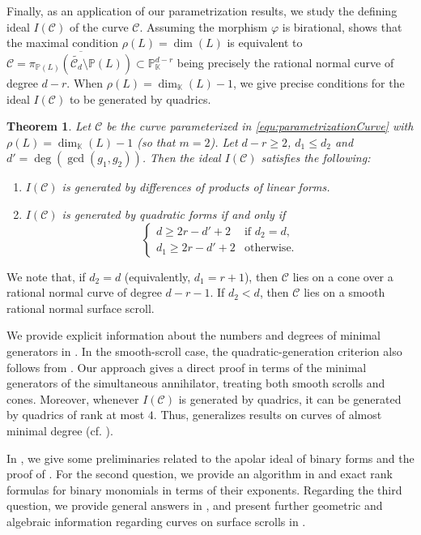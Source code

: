 \documentclass[a4paper, 11pt]{amsart}
\newtheorem{theorem}{Theorem}
\numberwithin{theorem}{section}
\theoremstyle{definition}
\numberwithin{equation}{section}
\begin{document}
Finally, as an application of our parametrization results, we study the defining ideal $I(\mathcal{C})$ of the curve $\mathcal{C}$. 
Assuming the morphism $\varphi$ is birational,  shows that the maximal condition $\rho(L) = \dim(L)$ is equivalent to $\mathcal{C} = \overline{\pi_{\mathbb{P}(L)}(\widetilde{\mathcal{C}_d}\setminus \mathbb{P}(L))} \subset \mathbb{P}_{\mathbb{K}}^{d-r}$ being precisely the rational normal curve of degree $d-r$. 
When $\rho(L) = \dim_{\mathbb{K}}(L)-1$, we give precise conditions for the ideal $I(\mathcal{C})$ to be generated by quadrics.

\begin{theorem}\label{thm:definingequs}
Let $\mathcal{C}$ be the curve parameterized in \eqref{equ:parametrizationCurve} with $\rho(L) = \dim_{\mathbb{K}} (L) - 1$ (so that $m = 2$).
Let $d-r\geq 2$, $d_1\leq d_2$ and $d'=\deg(\gcd(g_1,g_2))$. Then the ideal $I(\mathcal{C})$ satisfies the following:
\begin{enumerate}
    \item\label{thm:definingequs_forms} $I(\mathcal{C})$ is generated by differences of products of linear forms.
    \item\label{thm:definingequs_quad} $I(\mathcal{C})$ is generated by quadratic forms if and only if 
    \[
    \begin{cases}
    d \ge 2r-d'+2 & \text{if } d_2 = d, \\
    d_1 \ge 2r-d'+2 & \text{otherwise}.
    \end{cases}
    \]
\end{enumerate}
\end{theorem}
We note that, if $d_2=d$ (equivalently, $d_1=r+1$), then $\mathcal{C}$ lies on a cone
over a rational normal curve of degree $d-r-1$.
If $d_2<d$, then $\mathcal{C}$ lies on a smooth rational normal surface scroll.

We provide explicit information about the numbers and degrees of minimal generators in .
In the smooth-scroll case, the quadratic-generation criterion also follows from \cite[Theorem~4.4(2)]{MR3247023}.
Our approach gives a direct proof in terms of the minimal generators of the simultaneous annihilator, treating both smooth scrolls and cones.
Moreover, whenever $I(\mathcal C)$ is generated by quadrics,
it can be generated by quadrics of rank at most $4$.
Thus,  generalizes results on curves
of almost minimal degree (cf. \cite{MR5047032}).

In , we give some preliminaries related to the apolar ideal of binary forms and the proof of .
For the second question, we provide an algorithm in  and exact rank formulas for binary monomials in terms of their exponents.
Regarding the third question, we provide general answers in , and present further geometric and algebraic information regarding curves on surface scrolls in . 
\end{document}
